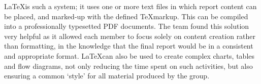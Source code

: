 \LaTeX is such a system; it uses one or more text files in which report content can be placed, and marked-up with the defined \TeX markup. This can be compiled into a professionally typesetted PDF documents. The team found this solution very helpful as it allowed each member to focus solely on content creation rather than formatting, in the knowledge that the final report would be in a consistent and appropriate format. \LaTeX can also be used to create complex charts, tables and flow diagrams, not only reducing the time spent on such activities, but also ensuring a common `style' for all material produced by the group.

